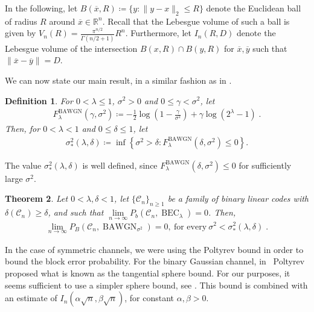 \documentclass{article}
\DeclareMathOperator{\BEC}{BEC}
\DeclareMathOperator{\BAWGN}{BAWGN}
\newcommand{\cC}{\mathcal{C}}
\theoremstyle{plain}
\newtheorem{definition}{Definition}%
\theoremstyle{plain}
\newtheorem{theorem}[definition]{Theorem}%
\theoremstyle{plain}
\theoremstyle{plain}
\theoremstyle{plain}
\theoremstyle{plain}
\theoremstyle{plain}
\theoremstyle{plain}
\theoremstyle{plain}
\theoremstyle{plain}
\theoremstyle{remark}
\theoremstyle{remark}
\theoremstyle{remark}
\theoremstyle{plain}
\begin{document}
In the following, let $B(\overline{x},R)
\coloneqq\{y:\|y-x\|_2\le R\}$ denote the Euclidean ball
of radius $R$ around $\overline{x}\in\mathbb{R}^n$. 
Recall that the Lebesgue volume of such a ball is given
by $V_n(R)=\frac{\pi^{n/2}}{\Gamma(n/2+1)}R^n$.
Furthermore, let $I_n(R,D)$ denote the Lebesgue volume of the
intersection $B(x,R)\cap B(y,R)$ for $\overline{x},\overline{y}$ such that
$\|\overline{x}-\overline{y}\|=D$.

We can now state our main result,
in a similar fashion as
in .

\begin{definition}
    For $0<\lambda\le 1$, $\sigma^2>0$ and $0\le\gamma<\sigma^2$, let 
    \begin{align*}
        F^{\BAWGN}_{\lambda}(\gamma,\sigma^2)\coloneqq
        -\frac{1}{2}\log\left(1-\frac{\gamma}{\sigma^2}\right)
        +\gamma\log(2^{\lambda}-1)\;.
    \end{align*}
    Then, for $0<\lambda<1$ and $0\le\delta\le 1$, let
    \begin{align*}
        \sigma^2_*(\lambda,\delta)\coloneqq
        \inf\left\{\sigma^2>\delta: F^{\BAWGN}_{\lambda}(\delta,\sigma^2)\le 0\right\}.
    \end{align*}
\end{definition}
The value $\sigma^2_*(\lambda,\delta)$ is well defined, since
$F^{\BAWGN}_{\lambda}(\delta,\sigma^2)\le 0$ for sufficiently
large $\sigma^2$.


\begin{theorem}
\label{thm:3}
    Let $0<\lambda,\delta<1$, let $\{\cC_n\}_{n\ge 1}$ be a family of binary linear codes with $\delta(\cC_n)\ge \delta$, and such that $\underset{n\to \infty}{\lim} P_b(\cC_n,\BEC_\lambda)=0$. Then,
\begin{align*}
    \underset{n\to \infty}{\lim} P_B\left(\cC_n,\BAWGN_{\sigma^2}\right)=0,\ \text{for every}\ \sigma^2<\sigma_*^2(\lambda,\delta)\;.
\end{align*}
\end{theorem}

In the case of symmetric channels, we were using the Poltyrev bound
in order to bound the block error probability.
For the binary Gaussian channel, in~\cite{poltyrev2002bounds} 
Poltyrev proposed what is known as the tangential sphere bound. For our purposes, it seems
sufficient to use a simpler sphere bound, see
\cite{HP94, sason2006performance}. This bound is combined
with an estimate of $I_n(\alpha\sqrt{n},\beta\sqrt{n})$,
for constant $\alpha,\beta>0$.
\end{document}
